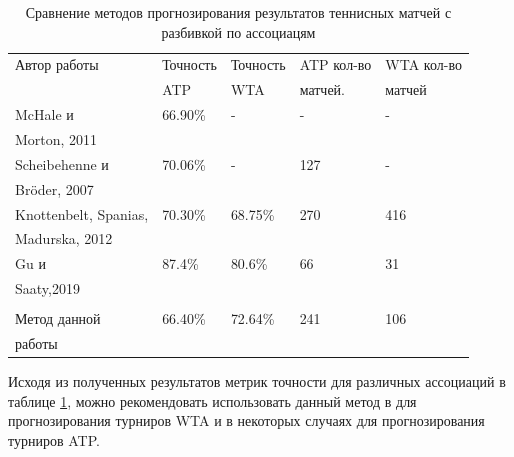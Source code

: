 \begin{table}
	\begin{center}
		\begin{tabular}{|l|l|l|l|l|}
			\hline
			
			Автор работы& Точность  & Точность&ATP кол-во  & WTA кол-во \\
			& ATP & WTA&матчей. & матчей \\
			\hline 
			
			McHale и &66.90\%& - & - & -  \\
			Morton, 2011  \cite{Book18} & & & &  \\
			\hline
			Scheibehenne и  & 70.06\% & - & 127 & -  \\
			Bröder,
			2007\cite{Book40} &&&& \\
			\hline
			Knottenbelt, Spanias,& 70.30\% & 68.75\% & 270& 416	\\		Madurska, 2012\cite{Book41} & & && \\
			\hline
			Gu и  &87.4\%& 80.6\%&66&31\\
			Saaty,2019\cite{Book42}&&&&\\
			\hline
			&&&&\\
			Метод данной &66.40\%& 72.64\%&241&106\\
			работы &&&&\\
			\hline
			
			
		\end{tabular}
	\end{center}
	\caption{Сравнение методов прогнозирования результатов теннисных матчей с разбивкой по ассоциацям}		
	\label{tab:issled2}
\end{table}


Исходя из полученных результатов метрик точности для различных ассоциаций в таблице \ref{tab:issled2}, можно рекомендовать использовать данный метод в для прогнозирования турниров WTA и в некоторых случаях для прогнозирования турниров ATP.
